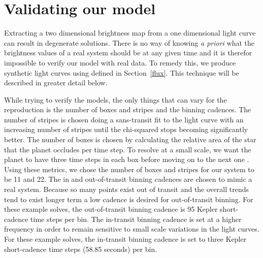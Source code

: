 

\section{Validating our model \label{validation}}
Extracting a two dimensional brightness map from a one dimensional light curve can result in degenerate solutions.  There is no way of knowing {\it a priori} what the brightness values of a real system should be at any given time and it is therefor impossible to verify our model with real data. To remedy this, we produce synthetic light curves using \fmod defined in Section~\ref{flux}. This technique will be described in greater detail below. 

While trying to verify the models, the only things that can vary for the reproduction is the number of boxes and stripes and the binning cadences. The number of stripes is chosen doing a sans-transit fit to the light curve with an increasing number of stripes until the chi-squared stops becoming significantly better. The number of boxes is chosen by calculating the relative area of the star that the planet occludes per time step. To resolve at a small scale, we want the planet to have three time steps in each box before moving on to the next one \citep{Huber2009}. Using these metrics, we chose the number of boxes and stripes for our system to be 11 and 22.  The in and out-of-transit binning cadences are chosen to mimic a real system. Because so many points exist out of transit and the overall trends tend to exist longer term a low cadence is desired for out-of-transit binning. For these example solves, the out-of-transit binning cadence is 95 Kepler short-cadence time steps per bin. The in-transit binning cadence is set at a higher frequency in order to remain sensitive to small scale variations in the light curves. For these example solves, the in-transit binning cadence is set to three Kepler short-cadence time steps (58.85 seconds) per bin.

